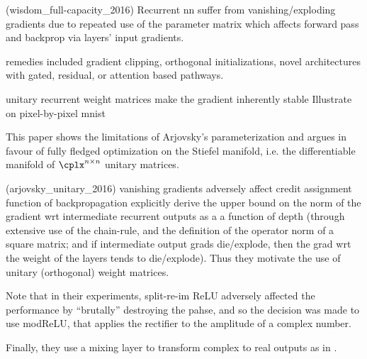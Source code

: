 (wisdom_full-capacity_2016)
Recurrent nn suffer from vanishing/exploding gradients due to repeated use of the parameter matrix
which affects forward pass and backprop via layers' input gradients.

remedies included gradient clipping, orthogonal initializations, novel architectures with
gated, residual, or attention based pathways.

unitary recurrent weight matrices make the gradient inherently stable \citep{arjovsky_unitary_2016}
Illustrate on pixel-by-pixel mnist

This paper shows the limitations of Arjovsky's parameterization and argues in favour of fully fledged
optimization on the Stiefel manifold, i.e. the differentiable manifold of $\cplx^{n \times n}$ unitary
matrices.

(arjovsky_unitary_2016)
vanishing gradients adversely affect credit assignment function of backpropagation
explicitly derive the upper bound on the norm of the gradient wrt intermediate recurrent outputs
as a a function of depth (through extensive use of the chain-rule, and the definition of the
operator norm of a square matrix; and if intermediate output grads die/explode, then the grad wrt
the weight of the layers tends to die/explode). Thus they motivate the use of unitary (orthogonal)
weight matrices.

Note that in their experiments, split-re-im ReLU adversely affected the performance by
``brutally'' destroying the pahse, and so the decision was made to use modReLU, that applies
the rectifier to the amplitude of a complex number.

Finally, they use a mixing layer to transform complex to real outputs as in \cite{wolter_yao_2018}.
